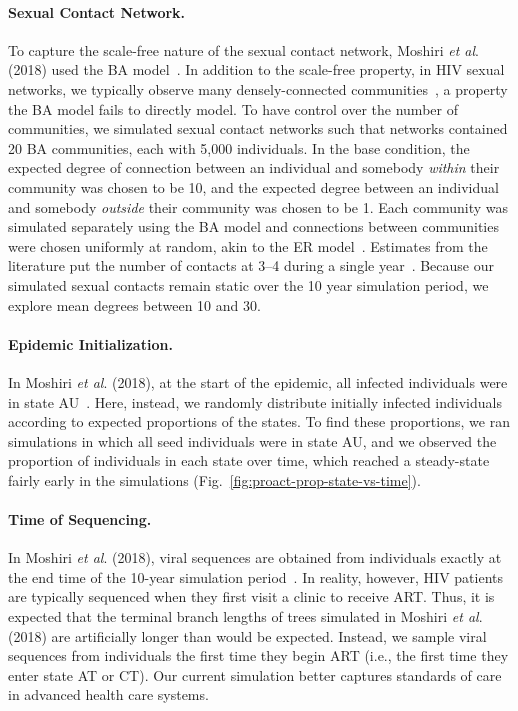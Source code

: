 \paragraph{Sexual Contact Network.} To capture the scale-free nature of the sexual contact network, Moshiri \textit{et al}. (2018) used the \gls{BA} model~\cite{Barabasi1999}. In addition to the scale-free property, in \gls{HIV} sexual networks, we typically observe many densely-connected communities~\cite{Rothenberg1998}, a property the \gls{BA} model fails to directly model. To have control over the number of communities,  we simulated sexual contact networks such that networks contained 20 \gls{BA} communities, each with 5,000 individuals. In the base condition, the expected degree of connection between an individual and somebody \textit{within} their community was chosen to be 10, and the expected degree between an individual and somebody \textit{outside} their community was chosen to be 1. Each community was simulated separately using the \gls{BA} model and connections between communities were chosen uniformly at random, akin to the \gls{ER} model~\cite{Erdos1959}. Estimates from the literature put the number of contacts at 3--4 during a single year~\cite{Rosenberg2011}. Because our simulated sexual contacts remain static over the 10 year simulation period, we explore mean degrees between 10 and 30.

\paragraph{Epidemic Initialization.} In Moshiri \textit{et al}. (2018), at the start of the epidemic, all infected individuals were in state AU~\cite{Moshiri2018}. Here, instead, we randomly distribute initially infected individuals according to expected proportions of the states. To find these proportions, we ran simulations in which all seed individuals were in state AU, and we observed the proportion of individuals in each state over time, which reached a steady-state fairly early in the simulations (Fig.~\ref{fig:proact-prop-state-vs-time}).

\paragraph{Time of Sequencing.} In Moshiri \textit{et al}. (2018), viral sequences are obtained from individuals exactly at the end time of the 10-year simulation period~\cite{Moshiri2018}. In reality, however, \gls{HIV} patients are typically sequenced when they first visit a clinic to receive \gls{ART}. Thus, it is expected that the terminal branch lengths of trees simulated in Moshiri \textit{et al}. (2018) are artificially longer than would be expected. Instead, we sample viral sequences from individuals the first time they begin \gls{ART} (i.e., the first time they enter state AT or CT). Our current simulation better captures standards of care in advanced health care systems.

